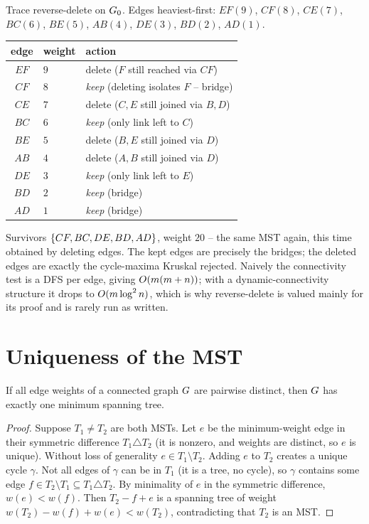 \begin{labbox}
Trace reverse-delete on $G_0$. Edges heaviest-first:
$EF(9)$, $CF(8)$, $CE(7)$, $BC(6)$, $BE(5)$, $AB(4)$, $DE(3)$, $BD(2)$, $AD(1)$.

\begin{center}
\begin{tabular}{cll}
\toprule
edge & weight & action \\
\midrule
$EF$ & $9$ & delete ($F$ still reached via $CF$) \\
$CF$ & $8$ & \emph{keep} (deleting isolates $F$ -- bridge) \\
$CE$ & $7$ & delete ($C,E$ still joined via $B,D$) \\
$BC$ & $6$ & \emph{keep} (only link left to $C$) \\
$BE$ & $5$ & delete ($B,E$ still joined via $D$) \\
$AB$ & $4$ & delete ($A,B$ still joined via $D$) \\
$DE$ & $3$ & \emph{keep} (only link left to $E$) \\
$BD$ & $2$ & \emph{keep} (bridge) \\
$AD$ & $1$ & \emph{keep} (bridge) \\
\bottomrule
\end{tabular}
\end{center}

Survivors $\{CF,BC,DE,BD,AD\}$, weight $20$ -- the same MST again, this time obtained by deleting edges. The kept edges are precisely the bridges; the deleted edges are exactly the cycle-maxima Kruskal rejected. Naively the connectivity test is a DFS per edge, giving $O(m(m+n))$; with a dynamic-connectivity structure it drops to $O(m\log^2 n)$, which is why reverse-delete is valued mainly for its proof and is rarely run as written.
\end{labbox}

\section{Uniqueness of the MST}
\label{ch06:uniqueness}

\begin{theorem}
\label{ch06:unique}
If all edge weights of a connected graph $G$ are pairwise distinct, then $G$ has exactly one minimum spanning tree.
\end{theorem}

\begin{proof}
Suppose $T_1\ne T_2$ are both MSTs. Let $e$ be the minimum-weight edge in their symmetric difference $T_1\triangle T_2$ (it is nonzero, and weights are distinct, so $e$ is unique). Without loss of generality $e\in T_1\setminus T_2$. Adding $e$ to $T_2$ creates a unique cycle $\gamma$. Not all edges of $\gamma$ can be in $T_1$ (it is a tree, no cycle), so $\gamma$ contains some edge $f\in T_2\setminus T_1\subseteq T_1\triangle T_2$. By minimality of $e$ in the symmetric difference, $w(e)<w(f)$. Then $T_2-f+e$ is a spanning tree of weight $w(T_2)-w(f)+w(e)<w(T_2)$, contradicting that $T_2$ is an MST.
\end{proof}

